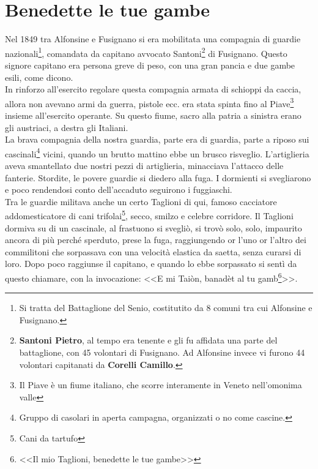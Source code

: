 
\chapter{Benedette le tue gambe}
Nel 1849 tra Alfonsine e Fusignano si era mobilitata una compagnia di guardie nazionali\footnote{Si tratta del Battaglione del Senio, costitutito da 8 comuni tra cui Alfonsine e Fusignano.}, comandata da capitano avvocato  Santoni\footnote{\textbf{Santoni Pietro}, al tempo era tenente e gli fu affidata una parte del battaglione, con 45 volontari di Fusignano. Ad Alfonsine invece vi furono 44 volontari capitanati da \textbf{Corelli Camillo}.} di Fusignano. Questo signore capitano era persona greve di peso, con una gran pancia e due gambe esili, come dicono.\\
\indent In rinforzo all'esercito regolare questa compagnia armata di schioppi da caccia, allora non avevano armi da guerra, pistole ecc. era stata spinta fino al Piave\footnote{Il Piave è un fiume italiano, che scorre interamente in Veneto nell'omonima valle} insieme all'esercito operante. Su questo fiume, sacro alla patria a sinistra erano gli austriaci, a destra gli Italiani.\\
\indent La brava compagnia della nostra guardia, parte era di guardia, parte a riposo sui cascinali\footnote{Gruppo di casolari in aperta campagna, organizzati o no come cascine.} vicini, quando un brutto mattino ebbe un brusco risveglio. L'artiglieria aveva smantellato due nostri pezzi di artiglieria, minacciava l'attacco delle fanterie. Stordite, le povere guardie si diedero alla fuga. I dormienti si svegliarono e poco rendendosi conto dell'accaduto seguirono i fuggiaschi.\\
\indent Tra le guardie militava anche un certo Taglioni di qui, famoso cacciatore addomesticatore di cani trifolai\footnote{Cani da tartufo}, secco, smilzo e celebre corridore. Il Taglioni dormiva su di un cascinale, al frastuono si svegliò, si trovò solo, solo, impaurito ancora di più perché sperduto, prese la fuga, raggiungendo or l'uno or l'altro dei commilitoni che sorpassava con una velocità elastica da saetta, senza curarsi di loro. Dopo poco raggiunse il capitano, e quando lo ebbe sorpassato si sentì da questo chiamare, con la invocazione: <<E mi Taiòn, banadèt al tu gamb\footnote{<<Il mio Taglioni, benedette le tue gambe>>}>>.\\
